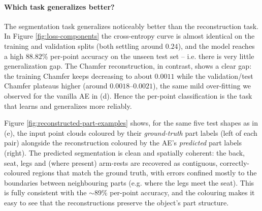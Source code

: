 \documentclass{article}
\begin{document}
\paragraph{Which task generalizes better?} The segmentation task generalizes noticeably better than the reconstruction task. In Figure \ref{fig:loss-components} the cross-entropy curve is almost identical on the training and validation splits (both settling around $0.24$), and the model reaches a high $88.82\%$ per-point accuracy on the unseen test set -- i.e. there is very little generalization gap. The Chamfer reconstruction, in contrast, shows a clear gap: the training Chamfer keeps decreasing to about $0.0011$ while the validation/test Chamfer plateaus higher (around $0.0018$--$0.0021$), the same mild over-fitting we observed for the vanilla AE in (d). Hence the per-point classification is the task that learns and generalizes more reliably.

Figure \ref{fig:reconstructed-part-examples} shows, for the same five test shapes as in (e), the input point clouds coloured by their \emph{ground-truth} part labels (left of each pair) alongside the reconstruction coloured by the AE's \emph{predicted} part labels (right). The predicted segmentation is clean and spatially coherent: the back, seat, legs and (where present) arm-rests are recovered as contiguous, correctly-coloured regions that match the ground truth, with errors confined mostly to the boundaries between neighbouring parts (e.g. where the legs meet the seat). This is fully consistent with the $\sim$89\% per-point accuracy, and the colouring makes it easy to see that the reconstructions preserve the object's part structure.
\end{document}
